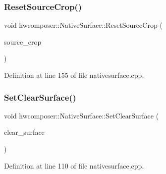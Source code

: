 \subsubsection{\texorpdfstring{Reset\+Source\+Crop()}{ResetSourceCrop()}}
{\footnotesize\ttfamily void hwcomposer\+::\+Native\+Surface\+::\+Reset\+Source\+Crop (\begin{DoxyParamCaption}\item[{const Hwc\+Rect$<$ float $>$ \&}]{source\+\_\+crop }\end{DoxyParamCaption})}



Definition at line 155 of file nativesurface.\+cpp.


\begin{DoxyCode}{0}
\end{DoxyCode}
\mbox{\label{classhwcomposer_1_1NativeSurface_ad2dd3e317071362a6dfefe3df74d91b0}} 
\subsubsection{\texorpdfstring{Set\+Clear\+Surface()}{SetClearSurface()}}
{\footnotesize\ttfamily void hwcomposer\+::\+Native\+Surface\+::\+Set\+Clear\+Surface (\begin{DoxyParamCaption}\item[{\mbox{\hyperlink{classhwcomposer_1_1NativeSurface_a0d0f955fc1e9f95c9684e9524f4217d6}{Native\+Surface\+::\+Clear\+Type}}}]{clear\+\_\+surface }\end{DoxyParamCaption})}



Definition at line 110 of file nativesurface.\+cpp.


